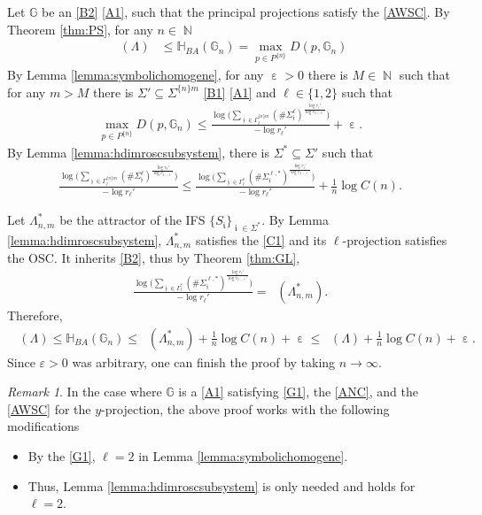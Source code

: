 \documentclass[a4paper, 11pt]{article}
\DeclareMathOperator{\N}{\mathbb{N}}
\DeclareMathOperator{\iii}{\mathfrak{i}}
\DeclareMathOperator{\jjj}{\mathfrak{j}}
\DeclareMathOperator{\eps}{\varepsilon}
\DeclareMathOperator{\dH}{\dim_{\mathrm{H}}}
\numberwithin{equation}{section}
\theoremstyle{plain}
\theoremstyle{remark}
\newtheorem{remark}[theorem]{Remark}
\theoremstyle{definition}
\begin{document}
Let $\mathbb{G}$ be an \ref{B2} \ref{A1}, such that the principal projections satisfy the \ref{AWSC}. By Theorem \ref{thm:PS}, for any $n \in \N$
\begin{align*}
\dH(\Lambda) &\leq \mathbb{H}_{BA}(\mathbb{G}_n) = \max_{p \in P^{\{n\}}}D(p, \mathbb{G}_n)
\end{align*}
By Lemma \ref{lemma:symbolichomogene}, for any $\eps>0$ there is $M \in \N$ such that for any $m>M$ there is $\Sigma' \subseteq \Sigma^{\{n\}m}$ \ref{B1} \ref{A1} and $\ell \in \{1,2\}$ such that
\begin{align*}
\max_{p \in P^{\{n\}}}D(p, \mathbb{G}_n) \leq \frac{\log \bigg(\sum\limits_{\jjj\in\Gamma_{\ell}^{\{n\}m}}(\#\Sigma_{\jjj}^\ell )^{\frac{\log r_\ell'}{\log r_{3-\ell}'}}\bigg)}{-\log r_\ell'} + \eps.
\end{align*}
By Lemma \ref{lemma:hdimroscsubsystem}, there is $\Sigma^* \subseteq \Sigma'$ such that
\begin{align*}
\frac{\log \bigg(\sum\limits_{\jjj\in\Gamma_{\ell}^{\{n\}m}}(\#\Sigma_{\jjj}^\ell )^{\frac{\log r_\ell'}{\log r_{3-\ell}'}}\bigg)}{-\log r_\ell'} \leq \frac{\log \bigg(\sum\limits_{\jjj\in\Gamma_{\ell}^{*}} (\#\Sigma_{\jjj}^{\ell,*} )^{\frac{\log r_\ell'}{\log r_{3-\ell}'}}\bigg)}{-\log r_\ell'} + \frac{1}{n}\log C(n).
\end{align*}


Let $\Lambda_{n,m}^*$ be the attractor of the IFS $\{S_{\iii}\}_{\iii \in \Sigma^*}$. By Lemma \ref{lemma:hdimroscsubsystem}, $\Lambda_{n,m}^*$ satisfies the \ref{C1} and its $\ell$-projection satisfies the OSC. It inherits \ref{B2}, thus by Theorem \ref{thm:GL},
\begin{align*}
\frac{\log \bigg(\sum\limits_{\jjj \in \Gamma_{\ell}^{*}} (\#\Sigma_{\jjj}^{\ell,*})^{\frac{\log r_\ell'}{\log r_{3-\ell}'}}\bigg)}{-\log r_\ell'} = \dH(\Lambda_{n,m}^*).
\end{align*}
Therefore,
\begin{align*}
\dH(\Lambda) \leq \mathbb{H}_{BA}(\mathbb{G}_n) \leq \dH(\Lambda_{n,m}^*) + \frac{1}{n}\log C(n) + \eps \leq \dH(\Lambda) + \frac{1}{n}\log C(n) + \eps .
\end{align*}
Since $\varepsilon>0$ was arbitrary, one can finish the proof by taking $n\to\infty$.

\vspace{5pt}

\begin{remark}
In the case where $\mathbb{G}$ is a \ref{A1} satisfying \ref{G1}, the \ref{ANC}, and the \ref{AWSC} for the $y$-projection, the above proof works with the following modifications
\begin{itemize}
\item By the \ref{G1}, $\ell = 2$ in Lemma \ref{lemma:symbolichomogene}.
\item Thus, Lemma \ref{lemma:hdimroscsubsystem} is only needed and holds for $\ell = 2$.
\end{itemize}
\end{remark}
\end{document}
